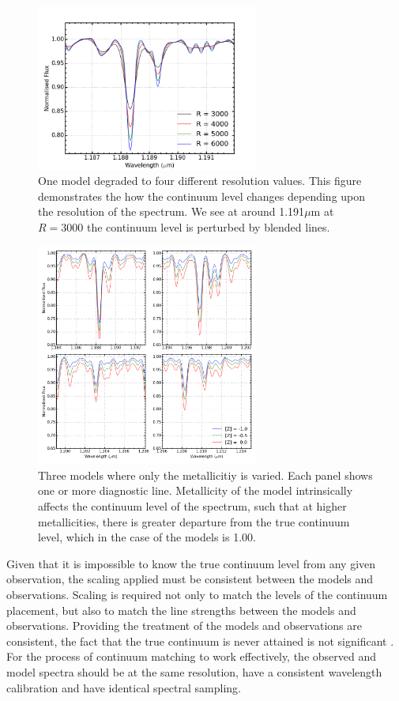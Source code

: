 \begin{figure}
 \centering
\includegraphics[width=0.65\textwidth]{JAnal/Resolution}
\caption{
One model degraded to four different resolution values.
This figure demonstrates the how the continuum level changes depending upon
the resolution of the spectrum.
We see at around 1.191$\mu$m at $R=3000$ the continuum level is perturbed by blended lines.\label{fig:mod-res}
         }
\end{figure}

\begin{figure}
 \centering
\includegraphics[width=0.65\textwidth]{JAnal/varyZ}
\caption{
Three models where only the metallicitiy is varied.
Each panel shows one or more diagnostic line.
Metallicity of the model intrinsically affects the continuum level of the spectrum,
such that at higher metallicities, there is greater departure from the true continuum level, which in the case of the models is 1.00.\label{fig:mod-zcont}
         }
\end{figure}


Given that it is impossible to know the true continuum level from any given observation,
the scaling applied must be consistent between the models and observations.
Scaling is required not only to match the levels of the continuum placement, but also to match the line strengths between the models and observations.
Providing the treatment of the models and observations are consistent, the fact that the true continuum is never attained is not significant
\citep{2014ApJ...788...58G}.
For the process of continuum matching to work effectively,
the observed and model spectra should be at the same resolution,
have a consistent wavelength calibration
and have identical spectral sampling.

